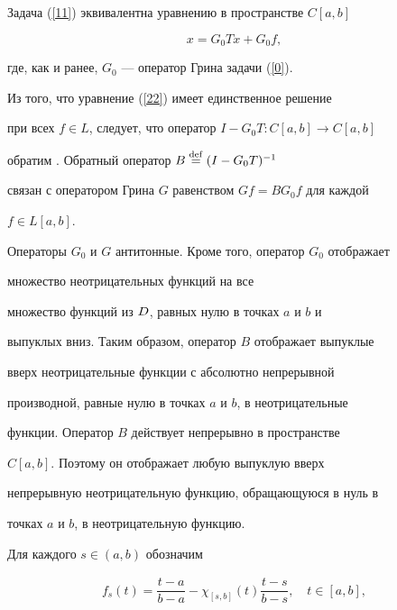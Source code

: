 \begin{pf}


Задача (\ref{11}) эквивалентна уравнению в пространстве $C[a,b]$


\begin{equation}


\label{22}x=G_0Tx+G_0f,


\end{equation}


где, как и ранее, $G_0$ --- оператор Грина задачи (\ref{0}).


Из того, что уравнение (\ref{22}) имеет единственное решение


при всех $f\in L$, следует, что оператор $I-G_0T:C[a,b]\to C[a,b]$


обратим \cite{MR}. Обратный оператор $B\overset{\mathrm{def}}{=}(I-G_0T)^{-1}$


связан с оператором Грина $G$ равенством $Gf=BG_0f$ для каждой


$f\in L[a,b]$.





Операторы $G_0$ и $G$ антитонные. Кроме того, оператор $G_0$ отображает


множество неотрицательных функций на все


множество функций из $D$, равных нулю в точках $a$ и $b$ и


выпуклых вниз. Таким образом, оператор $B$ отображает выпуклые


вверх неотрицательные функции с абсолютно непрерывной


производной, равные нулю в точках $a$ и $b$, в неотрицательные


функции. Оператор $B$ действует непрерывно в пространстве


$C[a,b]$. Поэтому он отображает любую выпуклую вверх


непрерывную неотрицательную функцию, обращающуюся в нуль в


точках $a$ и $b$, в неотрицательную функцию.





Для каждого $s\in(a,b)$ обозначим


\begin{gather*}


f_s(t)=


\dfrac{t-a}{b-a}-\chi_{[s,b]}(t)\dfrac{t-s}{b-s},\quad t\in[a,b], \\


%



\end{gather*}
\end{pf}
